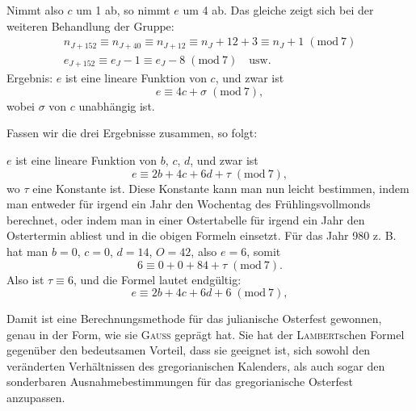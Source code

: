 \clearpage\begingroup{}
\renewcommand{\thefootnote}{\arabic{footnote})}\setcounter{footnote}{0}
\noindent\hspace*{\parindent}Nimmt also $c$ um 1 ab, so nimmt $e$ um 4 ab. Das gleiche zeigt sich
bei der weiteren Behandlung der Gruppe:
\[
\begin{gathered}
n_{J+152}\equiv n_{J+40}\equiv n_{J+12}\equiv n_J+12+3\equiv n_J+1\; (\mathrm{mod}\ 7)\\
e_{J+152}\equiv e_J-1\equiv e_J-8\; (\mathrm{mod}\ 7)\quad\text{usw.}
\end{gathered}
\]
\noindent Ergebnis: $e$ ist eine lineare Funktion von $c$, und zwar ist
\[
e\equiv4c+\sigma\; (\mathrm{mod}\ 7),
\]
\noindent wobei $\sigma$ von $c$ unabhängig ist.

Fassen wir die drei Ergebnisse zusammen, so folgt:
\par\noindent $e$ ist eine lineare Funktion von $b$, $c$, $d$, und zwar ist
\[
e\equiv2b+4c+6d+\tau\; (\mathrm{mod}\ 7),
\]
\noindent wo $\tau$ eine Konstante ist. Diese Konstante kann man nun leicht bestimmen,
indem man entweder für irgend ein Jahr den Wochentag des Frühlingsvollmonds berechnet, oder indem man in einer Ostertabelle für irgend ein Jahr
den Ostertermin abliest und in die obigen Formeln einsetzt. Für das Jahr
980 z. B. hat man $b=0$, $c=0$, $d=14$, $O=42$, also $e=6$, somit
\[
6\equiv0+0+84+\tau\; (\mathrm{mod}\ 7).
\]
\noindent Also ist $\tau\equiv6$, und die Formel lautet endgültig:
\[
e\equiv2b+4c+6d+6\; (\mathrm{mod}\ 7),
\]

Damit ist eine Berechnungsmethode für das julianische Osterfest gewonnen, genau in der Form, wie sie \textsc{Gauss} geprägt hat. Sie hat der \textsc{Lambert}schen Formel gegenüber den bedeutsamen Vorteil, dass sie geeignet ist,
sich sowohl den veränderten Verhältnissen des gregorianischen Kalenders, als
auch sogar den sonderbaren Ausnahmebestimmungen für das gregorianische
Osterfest anzupassen.

